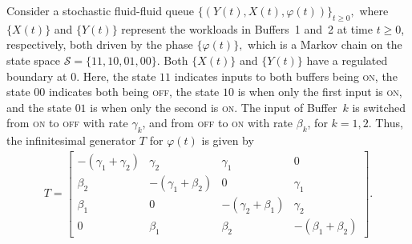 \begin{model}\label{model: ffq}
	Consider a stochastic fluid-fluid queue $\{(Y(t),X(t),\varphi(t))\}_{t\geq0},$ where $\{X(t)\}$ and $\{Y(t)\}$ represent the workloads in Buffers~1 and~2 at time $t \geq 0$, respectively, both driven by the phase $\{\varphi(t)\},$ which is a Markov chain on the state space $\mathcal{S} = \{11,10,01,00\}$. Both $\{X(t)\}$ and $\{Y(t)\}$ have a regulated boundary at 0. Here, the state $11$ indicates inputs to both buffers being \textnormal{\textsc{on}}, the state $00$ indicates both being \textnormal{\textsc{off}}, the state $10$ is when only the first input is \textnormal{\textsc{on}}, and the state $01$ is when only the second is \textnormal{\textsc{on}}. The input of Buffer~$k$ is switched from \textnormal{\textsc{on}} to \textnormal{\textsc{off}} with rate $\gamma_k$, and from \textnormal{\textsc{off}} to \textnormal{\textsc{on}} with rate $\beta_k$, for $k = 1, 2$. Thus, the infinitesimal generator $T$ for $\varphi(t)$ is given by 
	\begin{align*} 
		T = \left[ \begin{array}{cccc} -(\gamma_1 + \gamma_2) & \gamma_2 & \gamma_1 & 0 \\
							\beta_2 & -(\gamma_1 + \beta_2) & 0 & \gamma_1 \\
							\beta_1 & 0 & -(\gamma_2 + \beta_1) & \gamma_2 \\
							0 & \beta_1 &\beta_2 &-(\beta_1 + \beta_2)
	\end{array}\right].
	\end{align*} 


\end{model}

